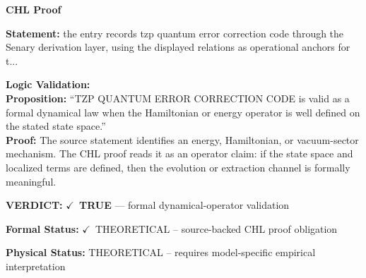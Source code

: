 \vspace{0.45em}
\noindent\textbf{CHL Proof}\par
\textbf{Statement:} the entry records tzp quantum error correction code through the Senary derivation layer,
using the displayed relations as operational anchors for t...

\textbf{Logic Validation:}\\
\textbf{Proposition:} ``TZP QUANTUM ERROR CORRECTION CODE is valid as a formal dynamical law when the
Hamiltonian or energy operator is well defined on the stated state space.''\\
\textbf{Proof:} The source statement identifies an energy, Hamiltonian, or vacuum-sector mechanism. The
CHL proof reads it as an operator claim: if the state space and localized terms are
defined, then the evolution or extraction channel is formally meaningful.

\textbf{VERDICT:} \ensuremath{\checkmark}\ \textbf{TRUE} --- formal dynamical-operator validation

\textbf{Formal Status:} \ensuremath{\checkmark}\ THEORETICAL -- source-backed CHL proof obligation

\textbf{Physical Status:} THEORETICAL -- requires model-specific empirical interpretation
\par\vspace{0.45em}
\par
\ifTZPDarkEdition
{}
\fi
\endgroup
\endgroup

